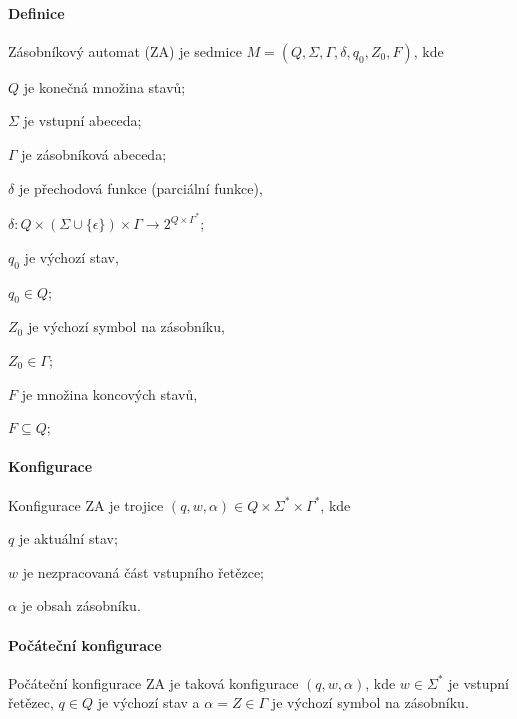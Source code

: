 \paragraph{Definice} Zásobníkový automat (ZA) je sedmice $M = (Q, \Sigma, \Gamma, \delta, q_0, Z_0, F)$, kde \begin{compactitem}
    \item $Q$ je konečná množina stavů;
    \item $\Sigma$ je vstupní abeceda;
    \item $\Gamma$ je zásobníková abeceda;
    \item $\delta$ je přechodová funkce (parciální funkce), \begin{compactitem}
        \item $\delta : Q \times ( \Sigma \cup \{ \epsilon \} ) \times \Gamma \rightarrow 2^{Q \times \Gamma^*}$;
    \end{compactitem}
    \item $q_0$ je výchozí stav, \begin{compactitem}
        \item $q_0 \in Q$;
    \end{compactitem}
    \item $Z_0$ je výchozí symbol na zásobníku, \begin{compactitem}
        \item $Z_0 \in \Gamma$;
    \end{compactitem}
    \item $F$ je množina koncových stavů, \begin{compactitem}
        \item $F \subseteq Q$;
    \end{compactitem}
\end{compactitem}

\paragraph{Konfigurace} Konfigurace ZA je trojice $(q, w, \alpha) \in Q \times \Sigma^* \times \Gamma^*$, kde \begin{compactitem}
    \item $q$ je aktuální stav;
    \item $w$ je nezpracovaná část vstupního řetězce;
    \item $\alpha$ je obsah zásobníku.
\end{compactitem}

\paragraph{Počáteční konfigurace} Počáteční konfigurace ZA je taková konfigurace $(q, w, \alpha)$, kde $w \in \Sigma^*$ je vstupní řetězec, $q \in Q$ je výchozí stav a $\alpha = Z \in \Gamma$ je výchozí symbol na zásobníku.

